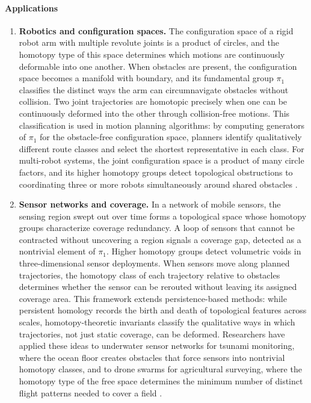 \paragraph{Applications}
\begin{enumerate}[leftmargin=*,itemsep=0.35em]
\item \textbf{Robotics and configuration spaces.} The configuration space of a rigid robot arm with multiple revolute joints is a product of circles, and the homotopy type of this space determines which motions are continuously deformable into one another. When obstacles are present, the configuration space becomes a manifold with boundary, and its fundamental group $\pi_1$ classifies the distinct ways the arm can circumnavigate obstacles without collision. Two joint trajectories are homotopic precisely when one can be continuously deformed into the other through collision-free motions. This classification is used in motion planning algorithms: by computing generators of $\pi_1$ for the obstacle-free configuration space, planners identify qualitatively different route classes and select the shortest representative in each class. For multi-robot systems, the joint configuration space is a product of many circle factors, and its higher homotopy groups detect topological obstructions to coordinating three or more robots simultaneously around shared obstacles \cite{homotopy_theory_ref1,homotopy_theory_ref3}.
\item \textbf{Sensor networks and coverage.} In a network of mobile sensors, the sensing region swept out over time forms a topological space whose homotopy groups characterize coverage redundancy. A loop of sensors that cannot be contracted without uncovering a region signals a coverage gap, detected as a nontrivial element of $\pi_1$. Higher homotopy groups detect volumetric voids in three-dimensional sensor deployments. When sensors move along planned trajectories, the homotopy class of each trajectory relative to obstacles determines whether the sensor can be rerouted without leaving its assigned coverage area. This framework extends persistence-based methods: while persistent homology records the birth and death of topological features across scales, homotopy-theoretic invariants classify the qualitative ways in which trajectories, not just static coverage, can be deformed. Researchers have applied these ideas to underwater sensor networks for tsunami monitoring, where the ocean floor creates obstacles that force sensors into nontrivial homotopy classes, and to drone swarms for agricultural surveying, where the homotopy type of the free space determines the minimum number of distinct flight patterns needed to cover a field \cite{homotopy_theory_ref2,homotopy_theory_ref3}.
\end{enumerate}
